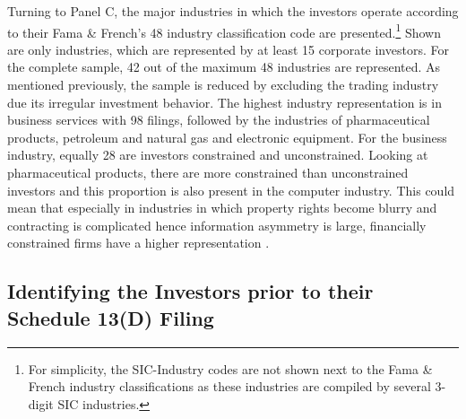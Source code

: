\documentclass[12pt]{article}
\begin{document}
Turning to Panel C, the major industries in which the investors operate according to their Fama \& French's 48 industry classification code are presented.\footnote{For simplicity, the SIC-Industry codes are not shown next to the Fama \& French industry classifications as these industries are compiled by several 3-digit SIC industries.} Shown are only industries, which are represented by at least 15 corporate investors. For the complete sample, 42 out of the maximum 48 industries are represented. As mentioned previously, the sample is reduced by excluding the trading industry due its irregular investment behavior. The highest industry representation is in business services with 98 filings, followed by the industries of pharmaceutical products, petroleum and natural gas and electronic equipment. For the business industry, equally 28 are investors constrained and unconstrained. Looking at pharmaceutical products, there are more constrained than unconstrained investors and this proportion is also present in the computer industry. This could mean that especially in industries in which property rights become blurry and contracting is complicated hence information asymmetry is large, financially constrained firms have a higher representation \citep[p.4]{Liao2014}.

\subsection{Identifying the Investors prior to their Schedule 13(D) Filing}
\end{document}
